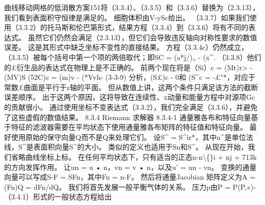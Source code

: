 \documentclass[UTF8,11pt,a4paper,openany,fontset=fandol]{ctexbook}
\begin{document}
曲线移动网格的低消散方案151将（3.3.4）、（3.3.5）和（3.3.6）替换为（2.3.13），我们看到表面积守恒律是满足的。 细胞体积由V-ySc给出。 （3.3.7）如果我们使用（3.3.2）的托马斯和伦巴第形式，结果方程（3.3.4）到（3.3.6）将有不同的表达式。 虽然它们仍然会满足（2.3.13），但它们会导致违反轴向对称性要求的数值误差。 这是其形式中缺乏坐标不变性的直接结果。 方程（3.3.4c）仍然成立，（3.3.5）被每个括号中第一个项的两倍取代；即SC = (a*j/)„ - (x\textasciicircum{}. （3.3.8）他们的£衍生品的表达式在物理上是不正确的。 前两个现在将是（Si）c = (Mt)r> - (MV)S (52C)c = (m)v - (*Vvh- (3-3-9) 分析，(S£)c - 0和 (S\textasciicircum{}c = -£"*，对应于常数£曲面是平行于z轴的平面。 但从数值上讲，这两个条件只满足该方法的截断误差顺序。 出于这两个原因，这将导致在连续性、x动量和能量方程中对源项Gc的贡献很小。 通过使用坐标不变表达式（3.3.2），我们完全满足（3.3.6），并避免了这些虚假的数值结果。 8.3.4 Riemann 求解器 8.3.4-1 通量雅各布和特征向量基于特征的滤波器需要在平均状态下使用通量雅各布矩阵的特征值和特征向量。 最好使用原始的保守向量Q而不是Q来处理它们。 设S\textasciicircum{} = S\textasciicircum{}ir*，其中n\textasciicircum{}是单位法线，S\textasciicircum{}是表面积向量S\textasciicircum{}的大小。 类似的定义也适用于Sn和S\textasciicircum{}。 从现在开始，我们省略曲线坐标上标。 在任何平均状态下，只有适当的正态n-n\textbackslash\{\}i + nj + 713k的方向发挥作用。 让un = u • n，vn = v • n，以及u' = un - vn。 变换的通量向量可以写成S-F = SFn，其中Fn = n-F。 然后将通量Jacobian 矩阵定义为A = (Fn)Q = dFn/dQ。 我们将首先发展一般平衡气体的关系。 压力p由P = P(P,«)-（3.4.1）形式的一般状态方程给出
\end{document}
